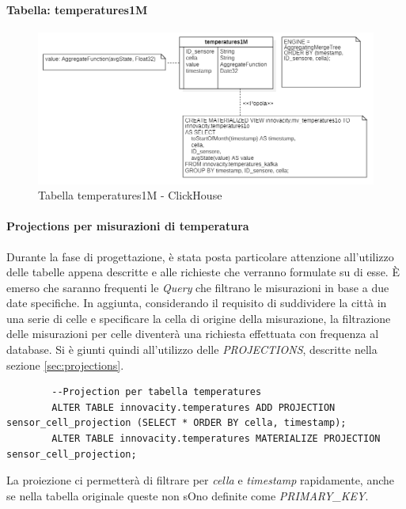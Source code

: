     \paragraph{Tabella: temperatures1M}
    \begin{figure}[H]
        \centering
        \includegraphics[width=1\textwidth]{../Images/SpecificaTecnica/temperatures1Mese.PNG}
        \caption{Tabella temperatures1M - ClickHouse}
        \label{fig:temperatures1M}
        \end{figure}
    
    \paragraph{Projections per misurazioni di temperatura}
    Durante la fase di progettazione, è stata posta particolare attenzione all'utilizzo delle tabelle appena descritte e alle richieste che verranno formulate su di esse. È emerso che saranno frequenti le \textit{Query} che filtrano le misurazioni in base a due date specifiche.
    In aggiunta, considerando il requisito di suddividere la città in una serie di celle e specificare la cella di origine della misurazione, la filtrazione delle misurazioni per celle diventerà una richiesta effettuata con frequenza al database.
    Si è giunti quindi all'utilizzo delle \textit{PROJECTIONS}, descritte nella sezione \ref{sec:projections}.

    \begin{lstlisting}
        --Projection per tabella temperatures
        ALTER TABLE innovacity.temperatures ADD PROJECTION sensor_cell_projection (SELECT * ORDER BY cella, timestamp);
        ALTER TABLE innovacity.temperatures MATERIALIZE PROJECTION sensor_cell_projection;
    \end{lstlisting}

    La proiezione ci permetterà di filtrare per \textit{cella} e \textit{timestamp} rapidamente, anche se nella tabella originale queste non sOno definite come \textit{PRIMARY\_KEY}.

